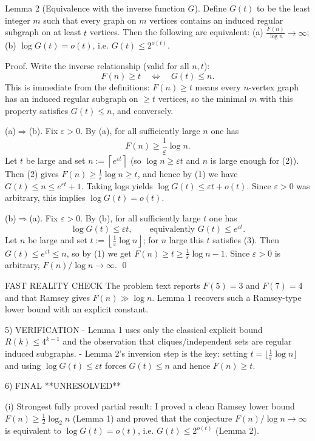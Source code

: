 Lemma 2 (Equivalence with the inverse function $G$).
Define $G(t)$ to be the least integer $m$ such that every graph on $m$ vertices contains an induced regular subgraph on at least $t$ vertices.
Then the following are equivalent:
(a) $\displaystyle \frac{F(n)}{\log n}\to\infty$;
(b) $\displaystyle \log G(t)=o(t)$, i.e. $G(t)\le 2^{o(t)}$.

Proof.
Write the inverse relationship (valid for all $n,t$):
\[F(n)\ge t \quad\Longleftrightarrow\quad G(t)\le n.\tag{1}\]
This is immediate from the definitions: $F(n)\ge t$ means every $n$-vertex graph has an induced regular subgraph on $\ge t$ vertices, so the minimal $m$ with this property satisfies $G(t)\le n$, and conversely.

(a)$\Rightarrow$(b).
Fix $\varepsilon>0$. By (a), for all sufficiently large $n$ one has
\[F(n)\ge \frac{1}{\varepsilon}\log n.\tag{2}\]
Let $t$ be large and set $n:=\left\lceil e^{\varepsilon t}\right\rceil$ (so $\log n\ge \varepsilon t$ and $n$ is large enough for (2)).
Then (2) gives $F(n)\ge \frac{1}{\varepsilon}\log n \ge t$, and hence by (1) we have $G(t)\le n\le e^{\varepsilon t}+1$.
Taking logs yields $\log G(t)\le \varepsilon t + o(t)$.
Since $\varepsilon>0$ was arbitrary, this implies $\log G(t)=o(t)$.

(b)$\Rightarrow$(a).
Fix $\varepsilon>0$. By (b), for all sufficiently large $t$ one has
\[\log G(t)\le \varepsilon t,\qquad\text{equivalently }G(t)\le e^{\varepsilon t}.\tag{3}\]
Let $n$ be large and set $t:=\left\lfloor \frac{1}{\varepsilon}\log n\right\rfloor$; for $n$ large this $t$ satisfies (3).
Then $G(t)\le e^{\varepsilon t}\le n$, so by (1) we get $F(n)\ge t\ge \frac{1}{\varepsilon}\log n-1$.
Since $\varepsilon>0$ is arbitrary, $F(n)/\log n\to\infty$. \qed

FAST REALITY CHECK
The problem text reports $F(5)=3$ and $F(7)=4$ and that Ramsey gives $F(n)\gg\log n$.
Lemma 1 recovers such a Ramsey-type lower bound with an explicit constant.

5) VERIFICATION
- Lemma 1 uses only the classical explicit bound $R(k)\le 4^{k-1}$ and the observation that cliques/independent sets are regular induced subgraphs.
- Lemma 2's inversion step is the key: setting $t=\lfloor \frac{1}{\varepsilon}\log n\rfloor$ and using $\log G(t)\le \varepsilon t$ forces $G(t)\le n$ and hence $F(n)\ge t$.

6) FINAL
**UNRESOLVED**

(i) Strongest fully proved partial result:
I proved a clean Ramsey lower bound $F(n)\ge \tfrac12\log_2 n$ (Lemma 1) and proved that the conjecture $F(n)/\log n\to\infty$ is equivalent to $\log G(t)=o(t)$, i.e. $G(t)\le 2^{o(t)}$ (Lemma 2).

